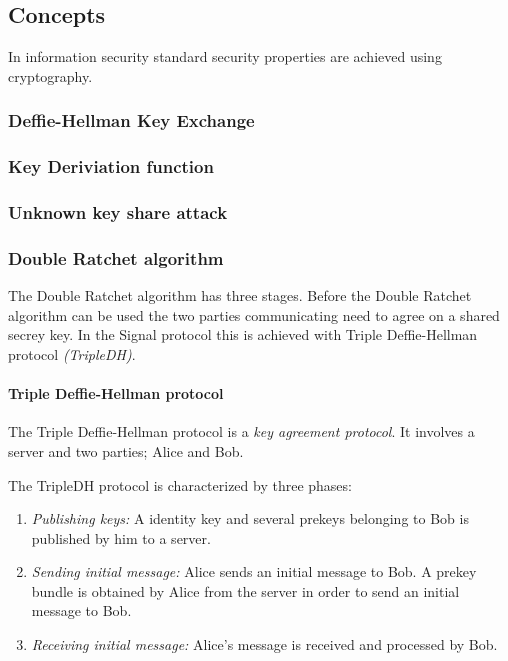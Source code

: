 \subsection{Concepts}
In information security standard security properties are achieved using cryptography.

 

\subsubsection{Deffie-Hellman Key Exchange}

\subsubsection{Key Deriviation function}

\subsubsection{Unknown key share attack}

\subsubsection{Double Ratchet algorithm}

The Double Ratchet algorithm has three stages. 
Before the Double Ratchet algorithm can be used the two parties communicating need to agree on a shared secrey key. In the Signal protocol this is achieved with Triple Deffie-Hellman protocol \emph{(TripleDH)}.

\paragraph{Triple Deffie-Hellman protocol}

The Triple Deffie-Hellman protocol is a \emph{key agreement protocol}. It involves a server and two parties; Alice and Bob. 

The TripleDH protocol is characterized by three phases:

\begin{enumerate}
	\item \emph{Publishing keys:} A identity key and several prekeys belonging to Bob is published by him to a server.
	\item \emph{Sending initial message:} Alice sends an initial message to Bob. A prekey bundle is obtained by Alice from the server in order to send an initial message to Bob.
	\item \emph{Receiving initial message:} Alice's message is received and processed by Bob.
\end{enumerate}

